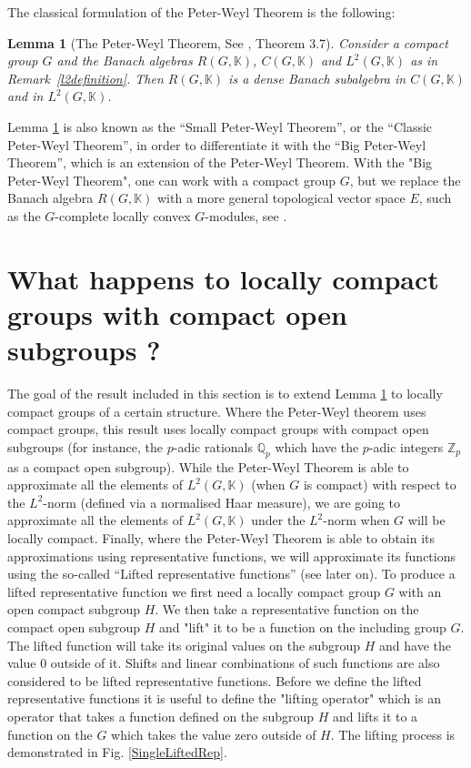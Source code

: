 \documentclass{amsart}
\newtheorem{lemma}[theorem]{Lemma}
\theoremstyle{definition}
\numberwithin{equation}{section}
\newcommand{\cgk}{C(G,\mathbb{K})}
\newcommand{\rgk}{R(G,\mathbb{K})}
\newcommand{\lgk}{L^2 (G,\mathbb{K})}
\newcommand{\lck}{L^2 (G,\mathbb{K})}
\newcommand{\K}{\mathbb{K}}
\begin{document}
 The classical formulation of the Peter-Weyl Theorem is the following:



\begin{lemma}[The Peter-Weyl Theorem, See \cite{hofmann}, Theorem 3.7]\label{smallpw}
Consider a compact group $G$ and the Banach algebras $\rgk$, $\cgk$ and $\lgk$ as in Remark~\ref{l2definition}. Then $R(G,\K)$ is a dense Banach subalgebra in $\cgk$ and in $\lgk$.
\end{lemma}

Lemma \ref{smallpw} is also known as the ``Small Peter-Weyl Theorem'', or the ``Classic Peter-Weyl Theorem'', in order to differentiate it with the ``Big Peter-Weyl Theorem'', which is an extension of the Peter-Weyl Theorem. With the "Big Peter-Weyl Theorem", one can work with a compact group $G$, but we replace the Banach algebra $\rgk$ with a more general topological vector space $E$, such as the $G$-complete locally convex $G$-modules, see \cite[Theorem 3.51]{hofmann}. 






 \section{What happens to locally compact groups with compact open subgroups ?}\label{3}

The goal of the result included in this section is to extend Lemma \ref{smallpw} to locally compact groups of a certain structure. Where the Peter-Weyl theorem uses compact groups, this result uses locally compact groups with  compact open subgroups (for instance, the $p$-adic rationals $\mathbb{Q}_p$ which have the $p$-adic integers $\mathbb{Z}_p$  as a compact open subgroup). While the Peter-Weyl Theorem is able to approximate all the elements of $\lgk$ (when $G$ is compact) with respect to the $L^2$-norm (defined via a normalised Haar measure), we are going to approximate all the elements  of $\lck$ under the $L^2$-norm when $G$ will be locally compact. Finally, where the Peter-Weyl Theorem is able to obtain its approximations using representative functions, we will approximate its functions using the so-called ``Lifted representative functions'' (see later on). To produce a lifted representative function we first need a locally compact group $G$ with an open compact subgroup $H$. We then take a representative function on the compact open subgroup $H$ and "lift" it to be a function on the including group $G$. The lifted function will take its original values on the subgroup $H$ and have the value 0 outside of it. Shifts and linear combinations of such functions are also considered to be lifted representative functions. Before we define the lifted representative functions it is useful to define the "lifting operator" which is an operator that takes a function defined on the subgroup $H$ and lifts it to a function on the $G$ which takes the value zero outside of $H$. The lifting process is demonstrated in Fig. \ref{SingleLiftedRep}.
\end{document}
